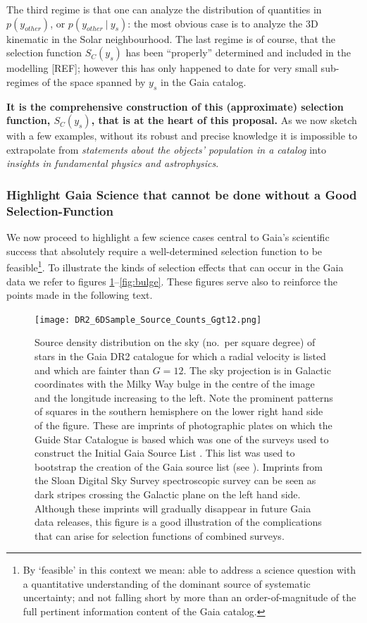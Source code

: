 The third regime is that one can analyze the distribution of quantities in $p(y_{other})$, or $p(y_{other}~|~y_s)$: the most obvious case is to analyze the 3D kinematic in the Solar neighbourhood. The last regime is of course, that the selection function $S_C(y_s)$ has been ``properly'' determined and included in the modelling [REF]; however this has only happened to date for very small sub-regimes of the space spanned by $y_s$ in the Gaia catalog.


\textbf{It is the comprehensive construction of this (approximate) selection function, $S_C(y_s)$, that is at the heart of this proposal.} As we now sketch with a few examples, without its robust and precise knowledge it is impossible to extrapolate from \textit{statements about the objects' population in a catalog} into \textit{insights in fundamental physics and astrophysics}.

\subsubsection{Highlight Gaia Science that cannot be done without a Good Selection-Function}
We now proceed to highlight a few science cases central to Gaia's scientific success that absolutely require a well-determined selection function to be feasible\footnote{By `feasible' in this context we mean: able to address a science question with a quantitative understanding of the dominant source of systematic uncertainty; and not falling short by more than an order-of-magnitude of the full pertinent information content of the Gaia catalog.}.
To illustrate the kinds of selection effects that can occur in the Gaia data we refer to figures \ref{fig:6dsample}--\ref{fig:bulge}. These figures serve also to reinforce the points made in the following text.
\\

\begin{figure}
    \centering
    \texttt{[image: DR2\_6DSample\_Source\_Counts\_Ggt12.png]}
    \caption{Source density distribution on the sky (no.\ per square degree) of stars in the Gaia DR2 catalogue for which a radial velocity is listed and which are fainter than $G=12$. The sky projection is in Galactic coordinates with the Milky Way bulge in the centre of the image and the longitude increasing to the left. Note the prominent patterns of squares in the southern hemisphere on the lower right hand side of the figure. These are imprints of photographic plates on which the Guide Star Catalogue is based which was one of the surveys used to construct the Initial Gaia Source List \cite{2014A&A...570A..87S}. This list was used to bootstrap the creation of the Gaia source list (see ). Imprints from the Sloan Digital Sky Survey spectroscopic survey can be seen as dark stripes crossing the Galactic plane on the left hand side. Although these imprints will gradually disappear in future Gaia data releases, this figure is a good illustration of the complications that can arise for selection functions of combined surveys.}
    \label{fig:6dsample}
\end{figure}

